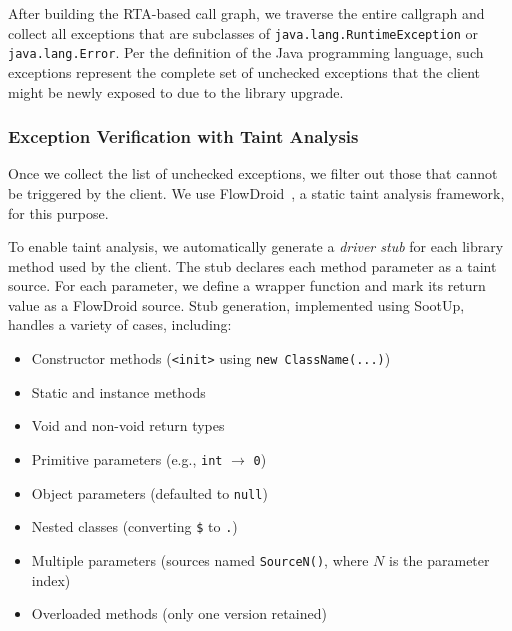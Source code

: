After building the RTA-based call graph, we traverse the entire callgraph and collect all exceptions that are subclasses of \texttt{java.lang.RuntimeException} or \texttt{java.lang.Error}. Per the definition of the Java programming language, such exceptions represent the complete set of unchecked exceptions that the client might be newly exposed to due to the library upgrade.

\subsubsection{Exception Verification with Taint Analysis}

Once we collect the list of unchecked exceptions, we filter out those that cannot be triggered by the client. We use FlowDroid~\cite{Arzt14:_flowdroid}, a static taint analysis framework, for this purpose.

To enable taint analysis, we automatically generate a \textit{driver stub} for each library method used by the client. The stub declares each method parameter as a taint source. For each parameter, we define a wrapper function and mark its return value as a FlowDroid source. Stub generation, implemented using SootUp, handles a variety of cases, including:
\begin{itemize}
  \item Constructor methods (\texttt{<init>} using \texttt{new ClassName(...)})
  \item Static and instance methods
  \item Void and non-void return types
  \item Primitive parameters (e.g., \texttt{int} $\rightarrow$ \texttt{0})
  \item Object parameters (defaulted to \texttt{null})
  \item Nested classes (converting \texttt{\$} to \texttt{.})
  \item Multiple parameters (sources named \texttt{SourceN()}, where $N$ is the parameter index)
  \item Overloaded methods (only one version retained)
\end{itemize}

